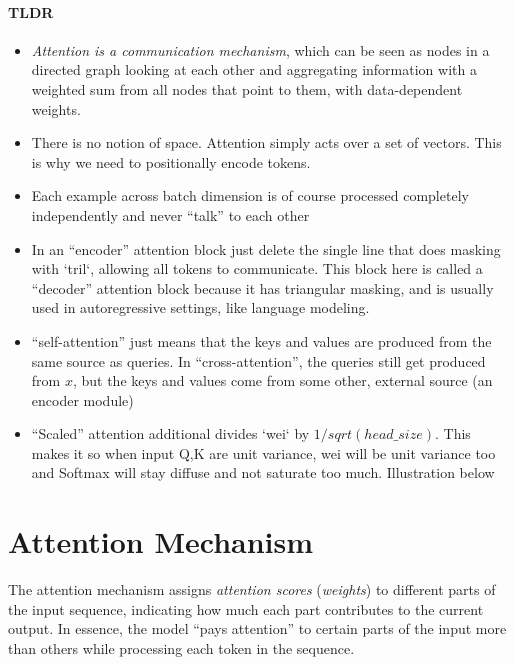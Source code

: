 
\paragraph{TLDR}
\begin{itemize}
	\item \textit{Attention is a communication mechanism}, which can be seen as nodes in a directed graph looking at each other and aggregating information with a weighted sum from all nodes that point to them, with data-dependent weights.
	\item There is no notion of space. Attention simply acts over a set of vectors. This is why we need to positionally encode tokens.
	\item Each example across batch dimension is of course processed completely independently and never ``talk'' to each other
	\item In an ``encoder'' attention block just delete the single line that does masking with `tril`, allowing all tokens to communicate. This block here is called a ``decoder'' attention block because it has triangular masking, and is usually used in autoregressive settings, like language modeling.
	\item ``self-attention'' just means that the keys and values are produced from the same source as queries. In ``cross-attention'', the queries still get produced from $x$, but the keys and values come from some other, external source (\eg an encoder module)
	\item ``Scaled'' attention additional divides `wei` by $1/sqrt(head\_size)$. This makes it so when input Q,K are unit variance, wei will be unit variance too and Softmax will stay diffuse and not saturate too much. Illustration below
\end{itemize}

\section{Attention Mechanism}
\label{sec:nlp_attention}

The attention mechanism assigns \textit{attention scores} (\ie \textit{weights}) to different parts of the input sequence, indicating how much each part contributes to the current output. In essence, the model ``pays attention'' to certain parts of the input more than others while processing each token in the sequence.



